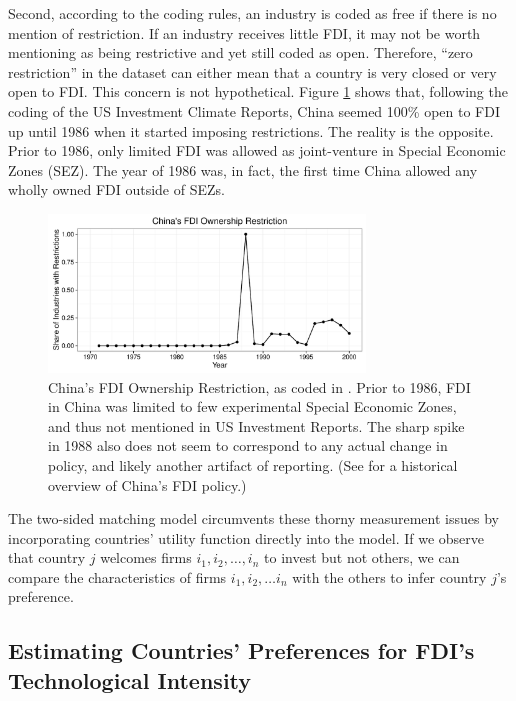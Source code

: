 Second, according to the coding rules, an industry is coded as free if there is
no mention of restriction. If an industry receives little FDI, it may not be
worth mentioning as being restrictive and yet still coded as open. Therefore,
``zero restriction'' in the dataset can either mean that a country is very
closed or very open to FDI. This concern is not hypothetical. Figure \ref{fig:china_fdi_restriction} shows that, following the coding of the US Investment Climate Reports, China seemed 100\% open to FDI up until 1986 when it started imposing restrictions. The reality is the opposite. Prior to 1986, only limited FDI was allowed as joint-venture in Special Economic Zones (SEZ). The year of 1986 was, in fact, the first time China allowed any wholly owned FDI outside of SEZs.

\begin{figure}[!ht]
\centering
\includegraphics[width=0.75\textwidth,keepaspectratio]{../figure/china_fdi_restriction}
\caption{China's FDI Ownership Restriction, as coded in \citet{Pandya2010}. Prior to 1986, FDI in China was limited to few experimental Special Economic Zones, and thus not mentioned in US Investment Reports. The sharp spike in 1988 also does not seem to correspond to any actual change in policy, and likely another artifact of reporting. (See \citet{Zebregs2002} for a historical overview of China's FDI policy.)}
\label{fig:china_fdi_restriction}
\end{figure}

The two-sided matching model circumvents these thorny measurement issues by incorporating countries' utility function directly into the model. If we observe that country $j$ welcomes firms $i_1, i_2, \dots, i_n$ to invest but not others, we can compare the characteristics of firms $i_1, i_2, \dots i_n$ with the others to infer country $j$'s preference.


\subsection{Estimating Countries' Preferences for FDI's Technological Intensity}

